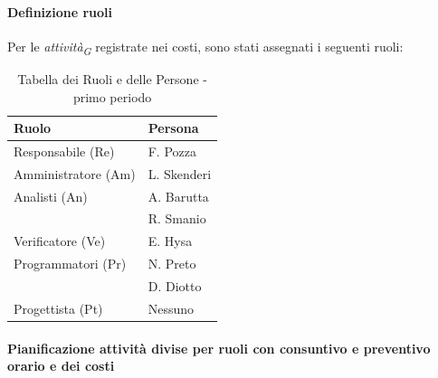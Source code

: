 \paragraph{Definizione ruoli}
Per le \textit{attività}\textsubscript{\textit{G}} registrate nei costi, sono stati assegnati i seguenti ruoli: 

\vspace{0.4cm}

\begin{table}[H]
    \centering
    \begin{tabular}{|L{4cm}|L{2cm}|}
        \hline
        \textbf{Ruolo} & \textbf{Persona} \\
        \hline
        \hline
        Responsabile (Re)   & F. Pozza \\
        \hline
        Amministratore (Am) & L. Skenderi \\
        \hline
        Analisti (An)       & A. Barutta \\
                            & R. Smanio \\
        \hline
        Verificatore (Ve)   & E. Hysa \\
        \hline
        Programmatori (Pr)  & N. Preto \\
                            & D. Diotto \\
        \hline
        Progettista (Pt)    & Nessuno \\
        \hline
    \end{tabular}
    \caption{Tabella dei Ruoli e delle Persone - primo periodo}
    \label{tab:Ruoli_persone_1}
    \end{table}

\newpage
\paragraph{Pianificazione attività divise per ruoli con consuntivo e preventivo orario e dei costi}

\vspace{0.4cm}

